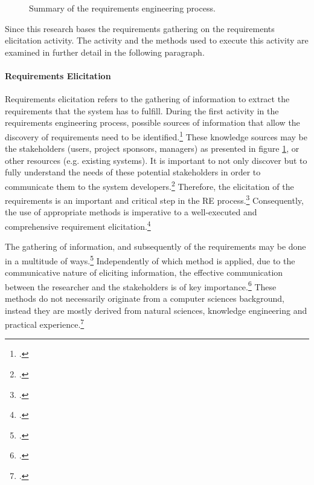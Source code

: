 \begin{figure}
    \centering
    
    \caption[Summary of the requirements engineering process.]{Summary of the requirements engineering process.\footnotemark}
    \label{fig:REAll}
\end{figure}
Since this research bases the requirements gathering on the requirements elicitation activity. The activity and the methods used to execute this activity are examined in further detail in the following paragraph. 

\paragraph{Requirements Elicitation} Requirements elicitation refers to the gathering of information to extract the requirements that the system has to fulfill. During the first activity in the requirements engineering process, possible sources of information that allow the discovery of requirements need to be identified.\footcites[Cf.][p.2]{TiwariMethodologySelectionRequirement2017}[cf.][p.17]{SommervilleIntegratedrequirementsengineering2005} These knowledge sources may be the stakeholders (users, project sponsors, managers) as presented in figure \ref{fig:REAll}, or other resources (e.g. existing systems). It is important to not only discover but to fully understand the needs of these potential stakeholders in order to communicate them to the system developers.\footcite[Cf.][p.21]{ZowghiRequirementselicitationsurvey2005} Therefore, the elicitation of the requirements is an important and critical step in the RE process.\footcites[Cf.][p.232]{ZhangEffectiverequirementsdevelopmentA2007}[cf.][p.19]{ZowghiRequirementselicitationsurvey2005} Consequently, the use of appropriate methods is imperative to a well-executed and comprehensive requirement elicitation.\footcite[Cf.][p.232]{ZhangEffectiverequirementsdevelopmentA2007}

The gathering of information, and subsequently of the requirements may be done in a multitude of ways.\footcite[Cf.][p.170]{HickeyElicitationtechniqueselection2003} Independently of which method is applied, due to the communicative nature of eliciting information, the effective communication between the researcher and the stakeholders is of key importance.\footcite[Cf.][p.1]{AlvarezDiscourseanalysisrequirements2002} These methods do not necessarily originate from a computer sciences background, instead they are mostly derived from natural sciences, knowledge engineering and practical experience.\footcite[Cf.][p.19]{ZowghiRequirementselicitationsurvey2005}

